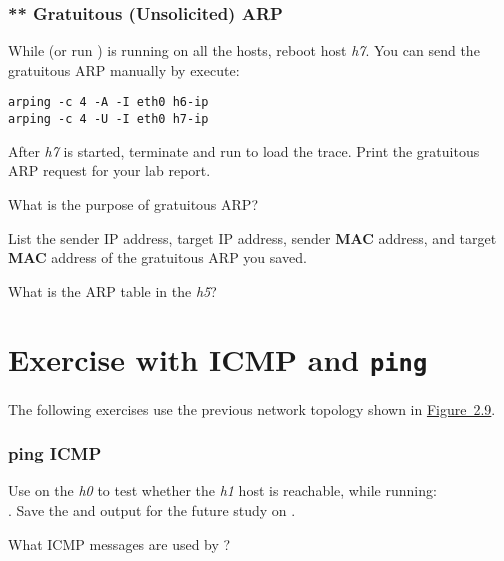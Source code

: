 \documentclass{../UTNetLab}
\begin{document}
\section{** Gratuitous (Unsolicited) ARP}
While  (or run ) is running on all the hosts, reboot host \textit{h7}.
You can send the gratuitous ARP manually by execute:

\begin{lstlisting}[emph={eth0,h7-ip,h6-ip}]
arping -c 4 -A -I eth0 h6-ip
arping -c 4 -U -I eth0 h7-ip
    \end{lstlisting}

After \textit{h7} is started, terminate  and run  to load the  trace.
Print the gratuitous ARP request for your lab report.

\begin{report}
    \item What is the purpose of gratuitous ARP?

    \item List the sender IP address, target IP address, sender \textbf{MAC} address, and target \textbf{MAC} address of the gratuitous ARP you saved.

    \item What is the ARP table in the \textit{h5}?
\end{report}


\part{Exercise with ICMP and \texttt{ping}}\label{sec:icmp-ping}
The following exercises use the previous network topology shown in \hyperref[fig:2.9]{Figure~2.9}.

\section{ping ICMP}
Use  on the \textit{h0} to test whether the \textit{h1} host is reachable, while running:\\
.
Save the  and  output for the future study on .

\begin{report}
    \item What ICMP messages are used by ?
\end{report}
\end{document}
